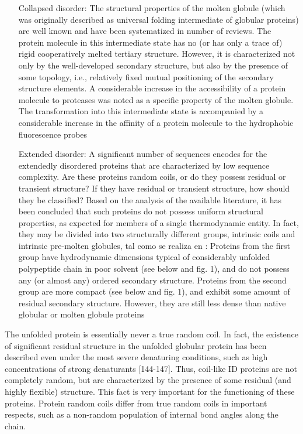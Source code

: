 \begin{itemize}
 \item[Collapsed disorder: ] The structural properties of the molten globule (which was originally described as universal folding intermediate of globular proteins) are well known and
have been systematized in number of reviews. The protein molecule in this intermediate state has no (or has only a trace of) rigid cooperatively melted tertiary structure. However, it is characterized not only by the well-developed secondary structure, but also by the presence of some topology, i.e., relatively fixed mutual positioning of the secondary structure elements. A considerable increase in the accessibility of a protein molecule to proteases was noted as a specific property of the molten globule.
The transformation into this intermediate state is accompanied by a considerable increase in the affinity of a protein molecule to the hydrophobic fluorescence probes

 \item[Extended disorder: ] A significant number of sequences encodes for the extendedly disordered proteins that are characterized by low sequence complexity. Are these proteins
random coils, or do they possess residual or transient structure? If they have residual or transient structure, how should they be classified? Based on the analysis of the available literature, it has been concluded that such proteins do not possess uniform structural properties, as expected for members of a single thermodynamic entity.
In fact, they may be divided into two structurally different groups, intrinsic coils and intrinsic pre-molten globules, tal como se realiza en \cite{uversky2002natively}: 
 Proteins from the first group have hydrodynamic dimensions typical of considerably unfolded polypeptide chain in poor solvent (see below and fig. 1), and do not possess any (or almost any) ordered secondary structure. 
Proteins from the second group are more compact (see below and fig. 1), and exhibit some amount of residual secondary structure. However, they are still less dense than native globular or molten globule proteins
\end{itemize}



The unfolded protein is essentially never a true random coil. In fact, the existence of significant residual structure in the unfolded globular protein has been described even under the most
severe denaturing conditions, such as high concentrations of strong denaturants [144-147]. Thus, coil-like ID proteins are not completely random, but are characterized by the presence
of some residual (and highly flexible) structure. This fact is very important for the functioning of these proteins.
Protein random coils differ from true random coils in important respects, such as a non-random population of internal bond angles along the chain.

